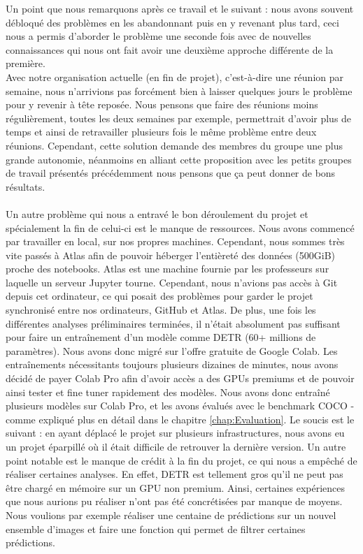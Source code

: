 Un point que nous remarquons après ce travail et le suivant : nous avons souvent débloqué des problèmes en les abandonnant puis en y revenant plus tard, ceci nous a permis d'aborder le problème une seconde fois avec de nouvelles connaissances qui nous ont fait avoir une deuxième approche différente de la première.
\\
Avec notre organisation actuelle (en fin de projet), c'est-à-dire une réunion par semaine, nous n'arrivions pas forcément bien à laisser quelques jours le problème pour y revenir à tête reposée. Nous pensons que faire des réunions moins régulièrement, toutes les deux semaines par exemple, permettrait d'avoir plus de temps et ainsi de retravailler plusieurs fois le même problème entre deux réunions. Cependant, cette solution demande des membres du groupe une plus grande autonomie, néanmoins en alliant cette proposition avec les petits groupes de travail présentés précédemment nous pensons que ça peut donner de bons résultats.

\paragraph{}
Un autre problème qui nous a entravé le bon déroulement du projet et spécialement la fin de celui-ci est le manque de ressources. Nous avons commencé par travailler en local, sur nos propres machines. Cependant, nous sommes très vite passés à Atlas afin de pouvoir héberger l'entièreté des données (500GiB) proche des notebooks. Atlas est une machine fournie par les professeurs sur laquelle un serveur Jupyter tourne. Cependant, nous n'avions pas accès à Git depuis cet ordinateur, ce qui posait des problèmes pour garder le projet synchronisé entre nos ordinateurs, GitHub et Atlas. De plus, une fois les différentes analyses préliminaires terminées, il n'était absolument pas suffisant pour faire un entraînement d'un modèle comme DETR (60+ millions de paramètres). Nous avons donc migré sur l'offre gratuite de Google Colab. Les entraînements nécessitants toujours plusieurs dizaines de minutes, nous avons décidé de payer Colab Pro afin d'avoir accès a des GPUs premiums 
et de pouvoir ainsi tester et fine tuner rapidement des modèles. Nous avons donc entraîné plusieurs modèles sur Colab Pro, et les avons évalués avec le benchmark COCO - comme expliqué plus en détail dans le chapitre \ref{chap:Evaluation}. Le soucis est le suivant : en ayant déplacé le projet sur plusieurs infrastructures, nous avons eu un projet éparpillé où il était difficile de retrouver la dernière version. Un autre point notable est le manque de crédit à la fin du projet, ce qui nous a empêché de réaliser certaines analyses. En effet, DETR est tellement gros qu'il ne peut pas être chargé en mémoire sur un GPU non premium. Ainsi, certaines expériences que nous aurions pu réaliser n'ont pas été concrétisées par manque de moyens. Nous voulions par exemple réaliser une centaine de prédictions sur un nouvel ensemble d'images et faire une fonction qui permet de filtrer certaines prédictions.
